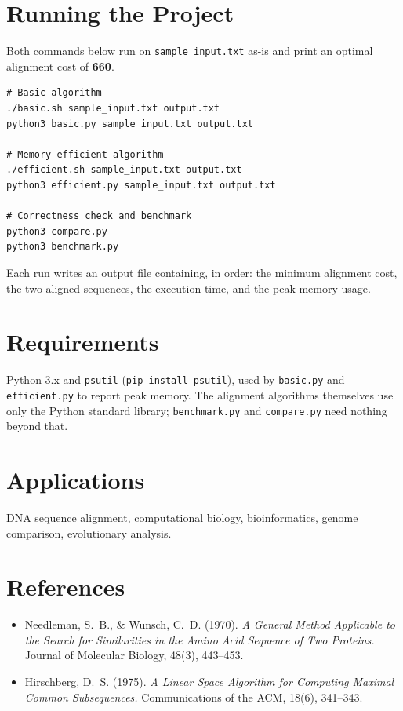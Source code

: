 \documentclass[11pt]{article}
\begin{document}
\section{Running the Project}

Both commands below run on \texttt{sample\_input.txt} as-is and print an
optimal alignment cost of \textbf{660}.

\begin{lstlisting}
# Basic algorithm
./basic.sh sample_input.txt output.txt
python3 basic.py sample_input.txt output.txt

# Memory-efficient algorithm
./efficient.sh sample_input.txt output.txt
python3 efficient.py sample_input.txt output.txt

# Correctness check and benchmark
python3 compare.py
python3 benchmark.py
\end{lstlisting}

Each run writes an output file containing, in order: the minimum alignment
cost, the two aligned sequences, the execution time, and the peak memory
usage.

\section{Requirements}

Python 3.x and \texttt{psutil} (\texttt{pip install psutil}), used by
\texttt{basic.py} and \texttt{efficient.py} to report peak memory. The
alignment algorithms themselves use only the Python standard library;
\texttt{benchmark.py} and \texttt{compare.py} need nothing beyond that.

\section{Applications}

DNA sequence alignment, computational biology, bioinformatics, genome
comparison, evolutionary analysis.

\section{References}

\begin{itemize}
    \item Needleman, S.~B., \& Wunsch, C.~D. (1970). \textit{A General Method
    Applicable to the Search for Similarities in the Amino Acid Sequence of
    Two Proteins.} Journal of Molecular Biology, 48(3), 443--453.
    \item Hirschberg, D.~S. (1975). \textit{A Linear Space Algorithm for
    Computing Maximal Common Subsequences.} Communications of the ACM, 18(6),
    341--343.
\end{itemize}
\end{document}
